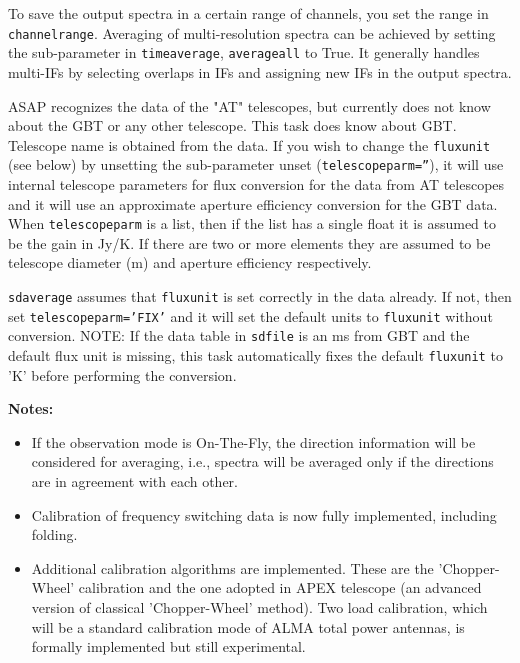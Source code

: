   To save the output spectra in a certain range of 
  channels, you set the range in {\tt channelrange}.
  Averaging of multi-resolution
  spectra can be achieved by setting the sub-parameter in {\tt timeaverage}, {\tt averageall} 
  to True. It generally handles multi-IFs by selecting overlaps in IFs and assigning
  new IFs in the output spectra.

  ASAP recognizes the data of the "AT" telescopes, but currently
  does not know about the GBT or any other telescope. This task
  does know about GBT. Telescope name is obtained from the data.
  If you wish to change the {\tt fluxunit} (see below) by unsetting
  the sub-parameter unset ({\tt telescopeparm=''}),
  it will use internal telescope parameters for
  flux conversion for the data from AT telescopes and it will use an
  approximate aperture efficiency conversion for the GBT data.
  When {\tt telescopeparm} is a list, then if the list has a single float it
  is assumed to be the gain in Jy/K.  If there are two or more elements they are assumed
  to be telescope diameter (m) and aperture efficiency
  respectively.

  {\tt sdaverage} assumes that {\tt fluxunit} is set correctly in
  the data already.  If not, then set {\tt telescopeparm='FIX'} and it
  will set the default units to {\tt fluxunit} without conversion.
  NOTE: If the data table in {\tt sdfile} is an ms from GBT and the default flux
  unit is missing, this task automatically fixes the default {\tt fluxunit}
  to 'K' before performing the conversion.

{\bf Notes:}
 \begin{itemize}
  \item If the observation mode is On-The-Fly, the direction
information will be considered for averaging, i.e., spectra will be
averaged only if the directions are in agreement with each other.
  \item Calibration of frequency switching data is now fully implemented, including folding.
  \item Additional calibration algorithms are implemented. These are the
'Chopper-Wheel' calibration and the one adopted in APEX telescope (an advanced version of classical 'Chopper-Wheel' method). Two load
calibration, which will be a standard calibration mode of ALMA total
power antennas, is formally implemented but still experimental.
\end{itemize}

